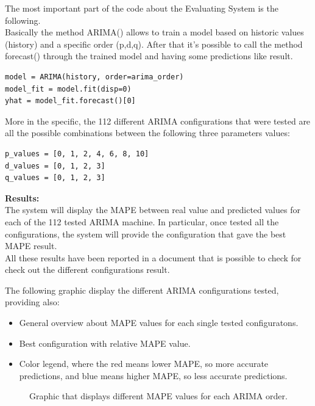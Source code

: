 The most important part of the code about the Evaluating System is the following.\\
Basically the method ARIMA() allows to train a model based on historic values (history) and a specific order (p,d,q). After that it's possible to call the method forecast() through the trained model and having some predictions like result.
\begin{lstlisting}
model = ARIMA(history, order=arima_order)
model_fit = model.fit(disp=0)
yhat = model_fit.forecast()[0]
\end{lstlisting}

More in the specific, the 112 different ARIMA configurations that were tested are all the possible combinations between the following three parameters values:
\begin{lstlisting}
p_values = [0, 1, 2, 4, 6, 8, 10]
d_values = [0, 1, 2, 3]
q_values = [0, 1, 2, 3]
\end{lstlisting}

\newpage

\textbf{Results:}\\
The system will display the MAPE between real value and predicted values for each of the 112 tested ARIMA machine. In particular, once tested all the configurations, the system will provide the configuration that gave the best MAPE result.\\
All these results have been reported in a document that is possible to check for check out the different configurations result.

The following graphic display the different ARIMA configurations tested, providing also:
\vspace{-5mm}
\begin{itemize}
 \setlength{\itemsep}{-5pt} 
\item General overview about MAPE values for each single tested configuratons. 
\item Best configuration with relative MAPE value.
\item Color legend, where the red means lower MAPE, so more accurate predictions, and blue means higher MAPE, so less accurate predictions.
\end{itemize}

\begin{figure}[H]
	\raggedleft
    \caption{Graphic that displays different MAPE values for each ARIMA order.}
\end{figure}

